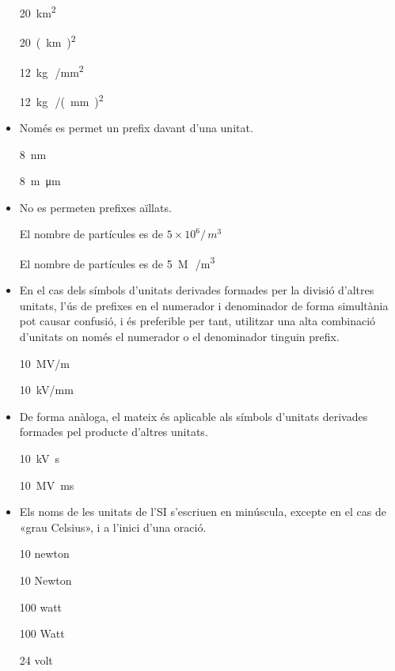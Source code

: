 \begin{itemize}
\textcolor{Green}\faCheckSquare{} \SI{20}{km^2}

\textcolor{Red}\faTimesCircle{} \SI{20}{(km)^2}

\textcolor{Green}\faCheckSquare{}  \SI{12}{kg\,/mm^2}

\textcolor{Red}\faTimesCircle{}  \SI{12}{kg\,/(mm)^2}


\item Només es permet un prefix davant d'una unitat.

\textcolor{Green}\faCheckSquare{} \SI{8}{nm}

\textcolor{Red}\faTimesCircle{} \SI{8}{m\micro m}


\item No es permeten prefixes aïllats.

\textcolor{Green}\faCheckSquare{} El nombre de partícules es de $5\times 10^6 /\si{\,m^3}$

\textcolor{Red}\faTimesCircle{} El nombre de partícules es de \SI{5}{M\,/m^3}


\item En el cas dels símbols d'unitats derivades formades per la divisió
d'altres unitats, l'ús de prefixes en el numerador i denominador de
forma simultània pot causar confusió, i és preferible per tant,
utilitzar una alta combinació d'unitats on només el numerador o el
denominador tinguin prefix.

\textcolor{Green}\faCheckSquare{} \SI{10}{MV/m}

\textcolor{Blue}\faQuestionCircle{}  \SI{10}{kV/mm}


\item De forma anàloga, el mateix és aplicable als símbols d'unitats
derivades formades pel producte d'altres unitats.

\textcolor{Green}\faCheckSquare{} \SI{10}{kV.s}

\textcolor{Blue}\faQuestionCircle{}  \SI{10}{MV.ms}


\item Els noms de les unitats de l'SI s'escriuen en minúscula, excepte en
el cas de «grau Celsius», i a l'inici d'una oració.

\textcolor{Green}\faCheckSquare{} 10 newton

\textcolor{Red}\faTimesCircle{} 10 Newton

\textcolor{Green}\faCheckSquare{}  100 watt

\textcolor{Red}\faTimesCircle{} 100 Watt

\textcolor{Green}\faCheckSquare{}  24 volt


\end{itemize}
